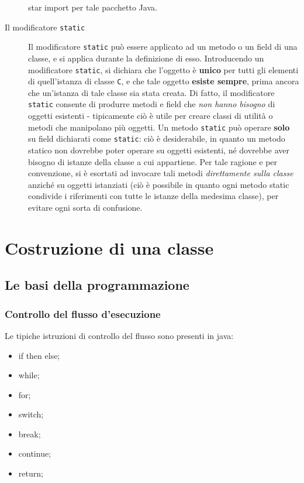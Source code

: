 \documentclass[\fontsizeclass,twocolumn]{\classname}
\theoremstyle{definition}
\theoremstyle{definition}
\begin{document}
\begin{description}
        star import per tale pacchetto Java.
    \item[Il modificatore \texttt{static}] Il modificatore \texttt{static} può
        essere applicato ad un metodo o un field di una classe, e si applica
        durante la definizione di esso. Introducendo un modificatore
        \texttt{static}, si dichiara che l'oggetto è \textbf{unico} per tutti
        gli elementi di quell'istanza di classe \texttt{C}, e che tale oggetto
        \textbf{esiste sempre}, prima ancora che un'istanza di tale classe sia
        stata creata. Di fatto, il modificatore \texttt{static} consente di
        produrre metodi e field che \emph{non hanno bisogno} di oggetti
        esistenti \-- tipicamente ciò è utile per creare classi di utilità o
        metodi che manipolano più oggetti. Un metodo \texttt{static} può
        operare \textbf{solo} su field dichiarati come \texttt{static}: ciò è
        desiderabile, in quanto un metodo statico non dovrebbe poter operare su
        oggetti esistenti, né dovrebbe aver bisogno di istanze della classe a
        cui appartiene. Per tale ragione e per convenzione, si è esortati ad
        invocare tali metodi \emph{direttamente sulla classe} anziché su
        oggetti istanziati (ciò è possibile in quanto ogni metodo static
        condivide i riferimenti con tutte le istanze della medesima classe),
        per evitare ogni sorta di confusione.
\end{description}



\chapter{Costruzione di una classe}

\section{Le basi della programmazione}

\subsection{Controllo del flusso d'esecuzione}

Le tipiche istruzioni di controllo del flusso sono presenti in java:
\begin{itemize}
    \item if then else;
    \item while;
    \item for;
    \item switch;
    \item break;
    \item continue;
    \item return;
\end{itemize}
\end{document}
